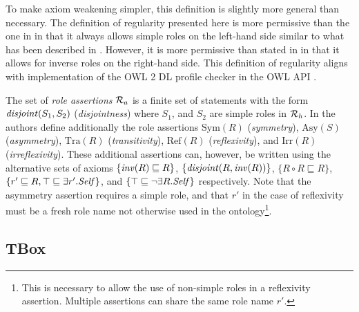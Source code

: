 \begin{example}
\end{example}

\begin{example}
\end{example}

To make axiom weakening simpler, this definition is slightly more general than necessary. The definition of regularity presented here is more permissive than the one in \cite{horrocks2006even} in that it always allows simple roles on the left-hand side similar to what has been described in \cite{rudolph2011foundations}. However, it is more permissive than stated in \cite{rudolph2011foundations} in that it allows for inverse roles on the right-hand side. This definition of regularity aligns with implementation of the OWL 2 DL \cite{motik2012ontology} profile checker in the OWL API \cite{horridge2011owl}.

The set of \emph{role assertions} $\mathcal{R}_a$ is a finite set of statements with the form $\mathit{disjoint}(S_1, S_2)$ (\emph{disjointness}) where $S_1$, and $S_2$ are simple roles in $\mathcal{R}_h$. In \cite{horrocks2006even} the authors define additionally the role assertions $\mathrm{Sym}(R)$ (\emph{symmetry}), $\mathrm{Asy}(S)$ (\emph{asymmetry}), $\mathrm{Tra}(R)$ (\emph{transitivity}), $\mathrm{Ref}(R)$ (\emph{reflexivity}), and $\mathrm{Irr}(R)$ (\emph{irreflexivity}). These additional assertions can, however, be written using the alternative sets of axioms $\{ \mathit{inv}(R) \sqsubseteq R \}$, $\{ \mathit{disjoint}(R, \mathit{inv}(R)) \}$, $\{ R \circ R \sqsubseteq R \}$, $\{ r' \sqsubseteq R , \top \sqsubseteq \exists r'.\mathit{Self} \}$, and $\{ \top \sqsubseteq \lnot \exists R.\mathit{Self} \}$ respectively. Note that the asymmetry assertion requires a simple role, and that $r'$ in the case of reflexivity must be a fresh role name not otherwise used in the ontology\footnote{This is necessary to allow the use of non-simple roles in a reflexivity assertion. Multiple assertions can share the same role name $r'$.}.

\subsection{TBox} \label{tbox}

